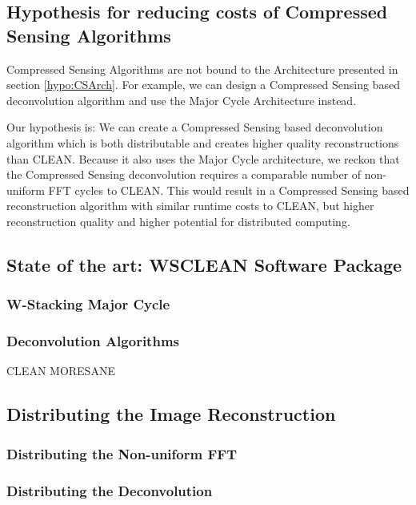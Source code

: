 \subsection{Hypothesis for reducing costs of Compressed Sensing Algorithms}
Compressed Sensing Algorithms are not bound to the Architecture presented in section \ref{hypo:CSArch}. For example, we can design a Compressed Sensing based deconvolution algorithm and use the Major Cycle Architecture instead. 

Our hypothesis is: We can create a Compressed Sensing based deconvolution algorithm which is both distributable and creates higher quality reconstructions than CLEAN. Because it also uses the Major Cycle architecture, we reckon that the Compressed Sensing deconvolution requires a comparable number of non-uniform FFT cycles to CLEAN. This would result in a Compressed Sensing based reconstruction algorithm with similar runtime costs to CLEAN, but higher reconstruction quality and higher potential for distributed computing.



\subsection{State of the art: WSCLEAN Software Package}


\subsubsection{W-Stacking Major Cycle}

\subsubsection{Deconvolution Algorithms}
CLEAN
MORESANE



\subsection{Distributing the Image Reconstruction}
\subsubsection{Distributing the Non-uniform FFT}


\subsubsection{Distributing the Deconvolution}







